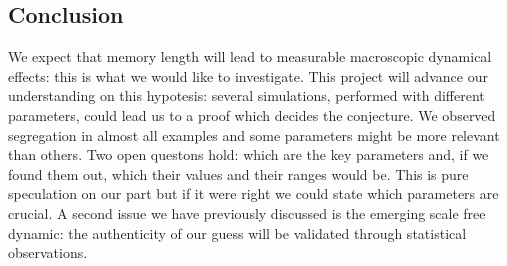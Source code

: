 \subsection{Conclusion}\label{subsec:conclusion}
%
%
%
%
 We expect that memory length will lead to measurable macroscopic
 dynamical effects: this is what we would like to investigate.
 This project will advance our understanding on this hypotesis:
 several simulations, performed with different parameters, could lead
 us to a proof which decides the conjecture.
 We observed segregation in almost all examples and some parameters might be
 more relevant than others. Two open questons hold: which are the key
 parameters and, if we found them out, which their values and
 their ranges would be.
 This is pure speculation on our part but if it were right we could
 state which parameters are crucial.
 A second issue we have previously discussed is the emerging scale
 free dynamic: the authenticity of our guess will be validated
 through statistical observations.
 
